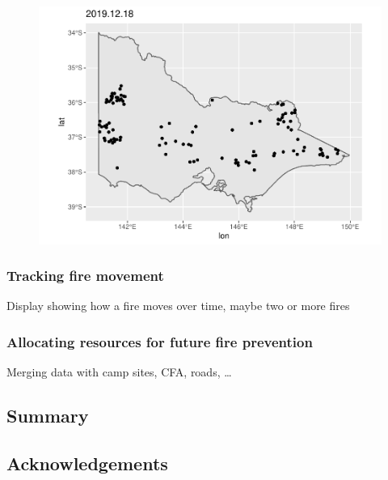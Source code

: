 \begin{Schunk}
\begin{figure}

{\centering \includegraphics[width=0.8\linewidth]{clustering_paper_files/figure-latex/app3-1} 

}

\end{figure}
\end{Schunk}

\hypertarget{tracking-fire-movement}{%
\subsubsection{Tracking fire movement}\label{tracking-fire-movement}}

Display showing how a fire moves over time, maybe two or more fires

\hypertarget{allocating-resources-for-future-fire-prevention}{%
\subsubsection{Allocating resources for future fire
prevention}\label{allocating-resources-for-future-fire-prevention}}

Merging data with camp sites, CFA, roads, \ldots{}

\hypertarget{summary}{%
\subsection{Summary}\label{summary}}

\hypertarget{acknowledgements}{%
\subsection{Acknowledgements}\label{acknowledgements}}

